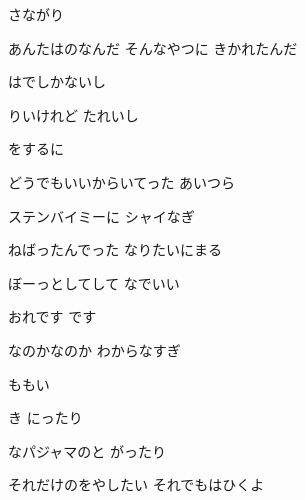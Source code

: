 \documentclass[a4paper,tate,twocolumn,12pt]{ltjtarticle}
\begin{document}
\begin{flushleft}
\begin{minipage}{\linewidth}
さながり

あんたはのなんだ そんなやつに きかれたんだ
\end{minipage}

\vspace{2em}

\noindent\begin{minipage}{\linewidth}
はでしかないし

りいけれど たれいし

をするに
\end{minipage}

\vspace{2em}

\noindent\begin{minipage}{\linewidth}
どうでもいいからいてった あいつら

ステンバイミーに シャイなぎ

ねばったんでった なりたいにまる

ぼーっとしてして なでいい
\end{minipage}

\vspace{2em}

\noindent\begin{minipage}{\linewidth}
おれです です

なのかなのか わからなすぎ

ももい

き にったり

なパジャマのと がったり

それだけのをやしたい それでもはひくよ
\end{minipage}


\end{flushleft}
\end{document}
